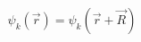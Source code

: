 \documentclass[preview]{standalone}
\begin{document}
\begin{align*}
\psi_k(\vec{r})= \psi_k(\vec{r}+\vec{R})
\end{align*}
\end{document}
